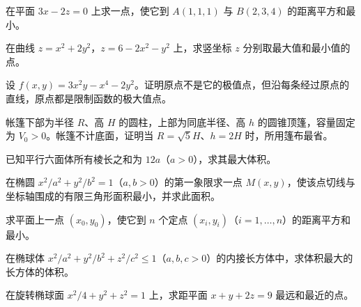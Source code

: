 \noindent\begin{minipage}{\textwidth}
在平面 $3x-2z=0$ 上求一点，使它到 $A(1,1,1)$ 与 $B(2,3,4)$ 的距离平方和最小。
\end{minipage}\par\vfill
\noindent\begin{minipage}{\textwidth}
在曲线 $z=x^2+2y^2$，$z=6-2x^2-y^2$ 上，求竖坐标 $z$ 分别取最大值和最小值的点。
\end{minipage}\par\vfill
\noindent\begin{minipage}{\textwidth}
设 $f(x,y)=3x^2y-x^4-2y^2$。证明原点不是它的极值点，但沿每条经过原点的直线，原点都是限制函数的极大值点。
\end{minipage}\par\vfill
\newpage
\noindent\begin{minipage}{\textwidth}
帐篷下部为半径 $R$、高 $H$ 的圆柱，上部为同底半径、高 $h$ 的圆锥顶篷，容量固定为 $V_0>0$。帐篷不计底面，证明当 $R=\sqrt5H$、$h=2H$ 时，所用篷布最省。
\end{minipage}\par\vfill
\noindent\begin{minipage}{\textwidth}
已知平行六面体所有棱长之和为 $12a$（$a>0$），求其最大体积。
\end{minipage}\par\vfill
\noindent\begin{minipage}{\textwidth}
在椭圆 $x^2/a^2+y^2/b^2=1$（$a,b>0$）的第一象限求一点 $M(x,y)$，使该点切线与坐标轴围成的有限三角形面积最小，并求此面积。
\end{minipage}\par\vfill
\noindent\begin{minipage}{\textwidth}
求平面上一点 $(x_0,y_0)$，使它到 $n$ 个定点 $(x_i,y_i)$（$i=1,\ldots,n$）的距离平方和最小。
\end{minipage}\par\vfill
\newpage
\noindent\begin{minipage}{\textwidth}
在椭球体 $x^2/a^2+y^2/b^2+z^2/c^2\le1$（$a,b,c>0$）的内接长方体中，求体积最大的长方体的体积。
\end{minipage}\par\vfill
\noindent\begin{minipage}{\textwidth}
在旋转椭球面 $x^2/4+y^2+z^2=1$ 上，求距平面 $x+y+2z=9$ 最远和最近的点。
\end{minipage}\par\vfill
